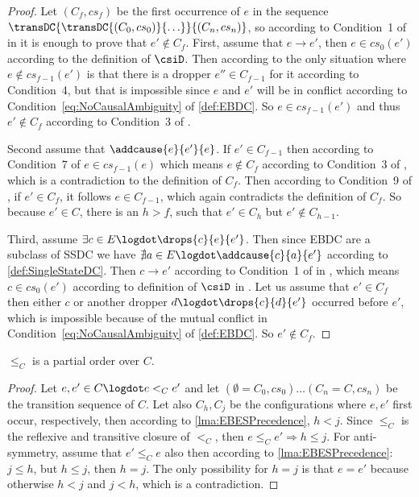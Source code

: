 \documentclass[runningheads,a4paper]{llncs}
\begin{document}
\begin{proof}
Let $(C_f, cs_f)$ be the first occurrence of $e$ in the sequence $ \transDC{\transDC{(C_0, cs_0)}{\ldots}}{(C_n, cs_n)}$, so according to
Condition~1 of  in \cite{dynamicCausality15} it is enough to prove that
$e' \notin C_f$.
First, assume that $e \rightarrow e'$, then $e \in cs_0(e')$
according to the definition of $\csiD$. Then
according to  the only situation where $e \notin cs_{f-1}(e')$ is that
there is a dropper $e'' \in C_{f-1}$ for it according to
Condition~4, but that is impossible
since $e$ and $e'$ will be in conflict according to
Condition~\ref{eq:NoCausalAmbiguity} of \ref{def:EBDC}. So $e \in cs_{f-1}(e')$ and thus $e'
\notin C_f$ according to Condition~3 of .

Second assume that $\addcause{e}{e'}{e}$.
If $e' \in C_{f-1}$ then according to
Condition~7 of  $e \in cs_{f-1}(e)$ which
means $e \notin C_f$ according to
Condition~3 of , which is a contradiction to the definition of $C_f$. 
Then according to Condition~9 of , if $e'
\in C_{f}$, it follows $e\in C_{f-1}$, which again contradicts the definition of $C_f$. So because $e'\in C$, there is an $h>f$, such that $e'\in C_h$ but $e'\notin C_{h-1}$.

Third, assume $\exists c
\in E\logdot \drops{c}{e}{e'}$. Then since EBDC are a subclass of SSDC we have
$\nexists a \in E \logdot \addcause{c}{a}{e'}$ according to \ref{def:SingleStateDC}. Then $c \rightarrow e'$ according to
Condition~1 of  in \cite{dynamicCausality15}, which means $c \in
cs_0(e')$ according to definition of $\csiD$ in .
Let us assume that $e' \in C_f$ then either $c$ or another dropper $d \logdot
\drops{c}{d}{e'}$ occurred before $e'$, which is impossible because of the
mutual conflict in Condition~\ref{eq:NoCausalAmbiguity} of \ref{def:EBDC}. So $e' \notin C_f$.
\end{proof}

\begin{lemma}
	\label{lma:EBESPrecIsOrder}
	$\leq_C$ is a partial order over $C$. 
\end{lemma}

\begin{proof}
Let $e,e' \in C \logdot e <_C e'$ and let $(\emptyset = C_0, cs_0) \ldots
(C_n = C, cs_n)$ be the transition sequence of $C$. Let also $C_h, C_j$ be the configurations
where $e, e'$ first occur, respectively, then according to \lem\ref{lma:EBESPrecedence}, $h<j$. Since $\leq_C$ is the reflexive and transitive
closure of $<_C$, then $e \leq_C e' \Longrightarrow h \leq j$. For
anti-symmetry, assume that $e' \leq_C e$ also then according to
\lem\ref{lma:EBESPrecedence}: $j \leq h$, but $h \leq j$, then $h = j$. The only
possibility for $h = j$ is that $e = e'$ because otherwise $h < j$ and $j<h$,
which is a contradiction.
\end{proof}
\end{document}
